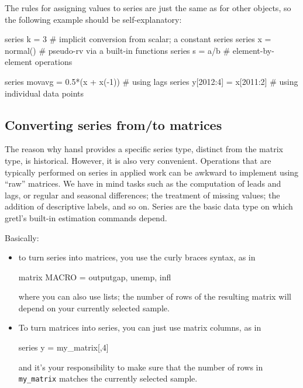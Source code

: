 The rules for assigning values to series are just the same as for
other objects, so the following example should be self-explanatory:
\begin{code}
  series k = 3         # implicit conversion from scalar; a constant series
  series x = normal()  # pseudo-rv via a built-in functions
  series s = a/b       # element-by-element operations

  series movavg = 0.5*(x + x(-1)) # using lags
  series y[2012:4] = x[2011:2]    # using individual data points 
\end{code}


\subsection{Converting series from/to matrices}

The reason why hansl provides a specific series type, distinct from
the matrix type, is historical. However, it is also very convenient.
Operations that are typically performed on series in applied work can
be awkward to implement using ``raw'' matrices. We have in mind tasks
such as the computation of leads and lags, or regular and seasonal
differences; the treatment of missing values; the addition of
descriptive labels, and so on. Series are the basic data type on which
gretl's built-in estimation commands depend.

Basically:
\begin{itemize}
\item to turn series into matrices, you use the curly braces syntax,
  as in
  \begin{code}
    matrix MACRO = { outputgap, unemp, infl }
  \end{code}
  where you can also use lists; the number of rows of the resulting
  matrix will depend on your currently selected sample.
\item To turn matrices into series, you can just use matrix columns,
  as in
  \begin{code}
    series y = my_matrix[,4]
  \end{code}
  and it's your responsibility to make sure that the number of rows in
  \texttt{my\_matrix} matches the currently selected sample.
\end{itemize}

